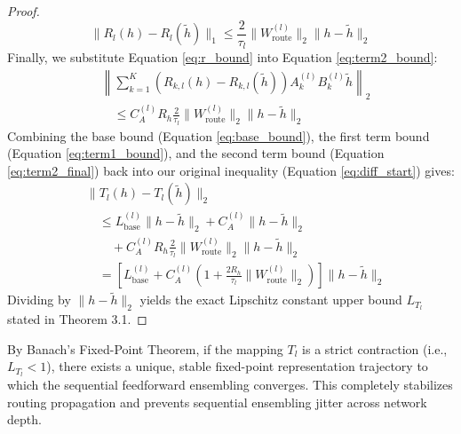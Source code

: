 \begin{proof}
\begin{equation}
\label{eq:r_bound}
\|R_l(h) - R_l(\tilde{h})\|_1 \le \frac{2}{\tau_l} \|W_{\text{route}}^{(l)}\|_2 \|h - \tilde{h}\|_2
\end{equation}
Finally, we substitute Equation \ref{eq:r_bound} into Equation \ref{eq:term2_bound}:
\begin{equation}
\label{eq:term2_final}
\begin{split}
& \left\| \sum_{k=1}^K \left( R_{k, l}(h) - R_{k, l}(\tilde{h}) \right) A_k^{(l)} B_k^{(l)} \tilde{h} \right\|_2 \\
& \quad \le C_A^{(l)} R_h \frac{2}{\tau_l} \|W_{\text{route}}^{(l)}\|_2 \|h - \tilde{h}\|_2
\end{split}
\end{equation}
Combining the base bound (Equation \ref{eq:base_bound}), the first term bound (Equation \ref{eq:term1_bound}), and the second term bound (Equation \ref{eq:term2_final}) back into our original inequality (Equation \ref{eq:diff_start}) gives:
\begin{align}
& \|T_l(h) - T_l(\tilde{h})\|_2 \nonumber \\
& \quad \le L_{\text{base}}^{(l)} \|h - \tilde{h}\|_2 + C_A^{(l)} \|h - \tilde{h}\|_2 \nonumber \\
& \quad \quad + C_A^{(l)} R_h \frac{2}{\tau_l} \|W_{\text{route}}^{(l)}\|_2 \|h - \tilde{h}\|_2 \nonumber \\
& \quad = \left[ L_{\text{base}}^{(l)} + C_A^{(l)} \left( 1 + \frac{2 R_h}{\tau_l} \|W_{\text{route}}^{(l)}\|_2 \right) \right] \|h - \tilde{h}\|_2
\end{align}
Dividing by $\|h - \tilde{h}\|_2$ yields the exact Lipschitz constant upper bound $L_{T_l}$ stated in Theorem 3.1.
\end{proof}

By Banach's Fixed-Point Theorem, if the mapping $T_l$ is a strict contraction (i.e., $L_{T_l} < 1$), there exists a unique, stable fixed-point representation trajectory to which the sequential feedforward ensembling converges. This completely stabilizes routing propagation and prevents sequential ensembling jitter across network depth.

